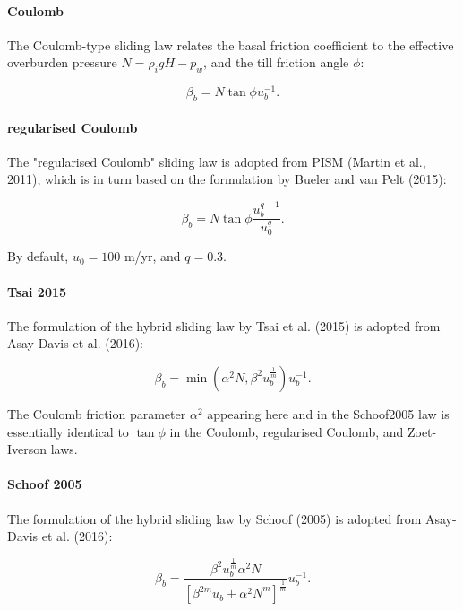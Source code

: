 \documentclass{article}
\begin{document}
\paragraph{Coulomb}
The Coulomb-type sliding law relates the basal friction coefficient to the effective overburden pressure $N = \rho_i g H - p_w$, and the till friction angle $\phi$:

\begin{equation} \label{eq:slid_Coulomb}
\beta_b = N \tan \phi u_b^{-1}.
\end{equation}

\paragraph{regularised Coulomb}
The "regularised Coulomb" sliding law is adopted from PISM (Martin et al., 2011), which is in turn based on the formulation by Bueler and van Pelt (2015):

\begin{equation} \label{eq:slid_Coulomb_reg}
\beta_b = N \tan \phi \frac{u_b^{q-1}}{u_0^q}.
\end{equation}

By default, $u_0 = 100$ m/yr, and $q=0.3$.

\paragraph{Tsai 2015}
The formulation of the hybrid sliding law by Tsai et al. (2015) is adopted from Asay-Davis et al. (2016):

\begin{equation} \label{eq:slid_Tsai2015}
\beta_b = \min \left( \alpha^2 N, \beta^2 u_b^{\frac{1}{m}}\right) u_b^{-1}.
\end{equation}

The Coulomb friction parameter $\alpha^2$ appearing here and in the Schoof2005 law is essentially identical to $\tan \phi$ in the Coulomb, regularised Coulomb, and Zoet-Iverson laws.

\paragraph{Schoof 2005}
The formulation of the hybrid sliding law by Schoof (2005) is adopted from Asay-Davis et al. (2016):

\begin{equation} \label{eq:slid_Schoof2005}
\beta_b = \frac{\beta^2 u_b^{\frac{1}{m}} \alpha^2 N }
{{\left[ \beta^{2m} u_b + {\alpha^2 N}^m \right]}^{\frac{1}{m}}} u_b^{-1}.
\end{equation}
\end{document}
